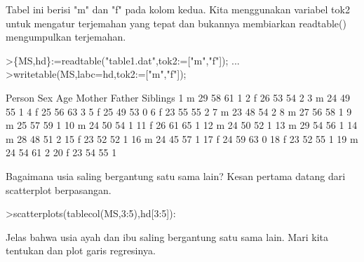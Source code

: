 \documentclass[12pt,Times new roman,letterpaper]{book}
\begin{document}
\begin{eulernootebook}
\begin{eulercomment}
\begin{eulercomment}
\begin{eulernootebook}
\begin{eulercomment}
\begin{eulercomment}
\begin{eulercomment}
\begin{eulercomment}
\begin{eulercomment}
\begin{eulercomment}
\begin{eulercomment}
\begin{eulercomment}
Tabel ini berisi "m" dan "f" pada kolom kedua. Kita menggunakan
variabel tok2 untuk mengatur terjemahan yang tepat dan bukannya
membiarkan readtable() mengumpulkan terjemahan.
\end{eulercomment}
\begin{eulerprompt}
>\{MS,hd\}:=readtable("table1.dat",tok2:=["m","f"]);  ...
>writetable(MS,labc=hd,tok2:=["m","f"]);
\end{eulerprompt}
\begin{euleroutput}
      Person       Sex       Age    Mother    Father  Siblings
           1         m        29        58        61         1
           2         f        26        53        54         2
           3         m        24        49        55         1
           4         f        25        56        63         3
           5         f        25        49        53         0
           6         f        23        55        55         2
           7         m        23        48        54         2
           8         m        27        56        58         1
           9         m        25        57        59         1
          10         m        24        50        54         1
          11         f        26        61        65         1
          12         m        24        50        52         1
          13         m        29        54        56         1
          14         m        28        48        51         2
          15         f        23        52        52         1
          16         m        24        45        57         1
          17         f        24        59        63         0
          18         f        23        52        55         1
          19         m        24        54        61         2
          20         f        23        54        55         1
\end{euleroutput}
\begin{eulercomment}
Bagaimana usia saling bergantung satu sama lain? Kesan pertama datang
dari scatterplot berpasangan.
\end{eulercomment}
\begin{eulerprompt}
>scatterplots(tablecol(MS,3:5),hd[3:5]):
\end{eulerprompt}
\begin{eulercomment}
Jelas bahwa usia ayah dan ibu saling bergantung satu sama lain. Mari
kita tentukan dan plot garis regresinya.
\end{eulercomment}
\begin{eulerprompt}

\end{eulerprompt}
\end{eulercomment}
\end{eulercomment}
\end{eulercomment}
\end{eulercomment}
\end{eulercomment}
\end{eulercomment}
\end{eulercomment}
\end{eulernootebook}
\end{eulercomment}
\end{eulercomment}
\end{eulernootebook}
\end{document}
